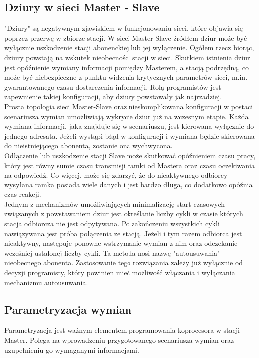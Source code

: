 \documentclass[a4paper,twoside]{article}
\begin{document}
\subsection{Dziury w sieci Master - Slave}
\label{subsec:dziury}
"Dziury" są negatywnym zjawiskiem w funkcjonowaniu sieci, które objawia się poprzez przerwę w zbiorze stacji. W sieci Master-Slave źródłem dziur może być wyłącznie uszkodzenie stacji abonenckiej lub jej wyłączenie. Ogółem rzecz biorąc, dziury powstają na wskutek nieobecności stacji w sieci. Skutkiem istnienia dziur jest opóźnienie wymiany informacji pomiędzy Masterem, a stacją podrzędną, co może być niebezpieczne z punktu widzenia krytycznych parametrów sieci, m.in. gwarantowanego czasu dostarczenia informacji. Rolą programistów jest zapewnienie takiej konfiguracji, aby dziury powstawały jak najrzadziej.\\
Prosta topologia sieci Master-Slave oraz nieskomplikowana konfiguracji w postaci scenariusza wymian umożliwiają wykrycie dziur już na wczesnym etapie. Każda wymiana informacji, jaka znajduje się w scenariuszu, jest kierowana wyłącznie do jednego adresata. Jeżeli wystąpi błąd w konfiguracji i wymiana będzie skierowana do nieistniejącego abonenta, zostanie ona wychwycona.\\
Odłączenie lub uszkodzenie stacji Slave może skutkować opóźnieniem czasu pracy, który jest równy sumie czasu transmisji ramki od Mastera oraz czasu oczekiwania na odpowiedź. Co więcej, może się zdarzyć, że do nieaktywnego odbiorcy wysyłana ramka posiada wiele danych i jest bardzo długa, co dodatkowo opóźnia czas reakcji.\\
Jednym z mechanizmów umożliwiających minimalizację start czasowych związanych z powstawaniem dziur jest określanie liczby cykli w czasie których stacja odbiorcza nie jest odpytywana. Po zakończeniu wszystkich cykli nawiązywana jest próba połączenia ze stacją. Jeżeli i tym razem odbiorca jest nieaktywny, następuje ponowne wstrzymanie wymian z nim oraz odczekanie wcześniej ustalonej liczby cykli. Ta metoda nosi nazwę "autousuwania" nieobecnego abonenta. Zastosowanie tego rozwiązania zależy już wyłącznie od decyzji programisty, który powinien mieć możliwość włączania i wyłączania mechanizmu autousuwania.

\subsection{Parametryzacja wymian}
Parametryzacja jest ważnym elementem programowania koprocesora w stacji Master. Polega na wprowadzeniu przygotowanego scenariusza wymian oraz uzupełnieniu go wymaganymi informacjami.
\end{document}
